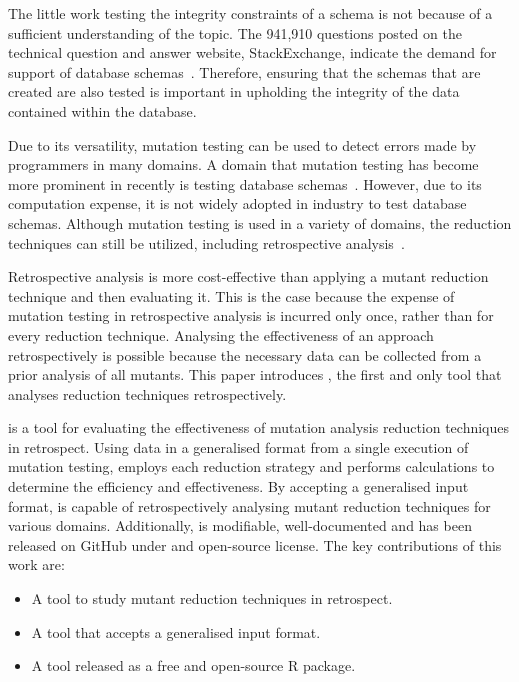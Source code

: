 

The little work testing the integrity constraints of a schema is not
because of a sufficient understanding of the topic. The 941,910 questions posted on
the technical question and answer website, StackExchange, indicate the demand for support
of database schemas~\cite{stackexchange}. Therefore, ensuring that
the schemas that are created are also tested is important in upholding the integrity
of the data contained within the database.

Due to its versatility, mutation testing can be used to detect errors made by programmers in many domains.
A domain that mutation testing has become more prominent in recently is testing database
schemas~\cite{mcminn2016virtual, mcminn2015effectiveness, wright2013efficient}. However,
due to its computation expense, it is not widely adopted in industry to test database schemas.
Although mutation testing is used in a variety of domains, the reduction techniques can still
be utilized, including retrospective analysis~\cite{jia2011analysis, wong1995reducing, offutt1993experimental, offutt2001mutation}.

Retrospective analysis is more cost-effective than applying a
mutant reduction technique and then evaluating it.
This is the case because the expense of mutation testing in
retrospective analysis is incurred only once, rather than for
every reduction technique. Analysing the effectiveness of an approach retrospectively
is possible because the necessary data can be collected from a prior analysis of all mutants.
This paper introduces \mr, the first and only tool that analyses reduction techniques retrospectively.

\mr is a tool for evaluating the effectiveness of mutation analysis reduction techniques
in retrospect. Using data in a generalised format from a single execution of mutation testing, \mr
employs each reduction strategy and performs calculations to determine the efficiency and
effectiveness. By accepting a generalised input format, \mr is capable of
retrospectively analysing mutant reduction techniques for various domains.
Additionally, \mr is modifiable, well-documented and has been released on
GitHub under and open-source license. The key contributions of this work are:

    \begin{itemize}
        \item A tool to study mutant reduction techniques in retrospect.
        \item A tool that accepts a generalised input format.
        \item A tool released as a free and open-source R package.
    \end{itemize}
